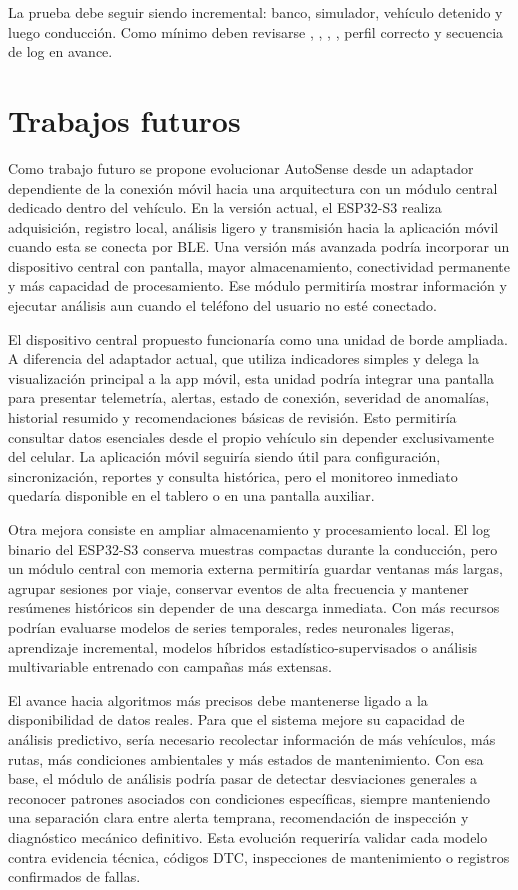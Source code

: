 \documentclass[12pt,letterpaper]{report}
\begin{document}
La prueba debe seguir siendo incremental: banco, simulador, vehículo detenido y luego conducción. Como mínimo deben revisarse , , , , perfil correcto y secuencia de log en avance.

\section{Trabajos futuros}

Como trabajo futuro se propone evolucionar AutoSense desde un adaptador dependiente de la conexión móvil hacia una arquitectura con un módulo central dedicado dentro del vehículo. En la versión actual, el ESP32-S3 realiza adquisición, registro local, análisis ligero y transmisión hacia la aplicación móvil cuando esta se conecta por BLE. Una versión más avanzada podría incorporar un dispositivo central con pantalla, mayor almacenamiento, conectividad permanente y más capacidad de procesamiento. Ese módulo permitiría mostrar información y ejecutar análisis aun cuando el teléfono del usuario no esté conectado.

El dispositivo central propuesto funcionaría como una unidad de borde ampliada. A diferencia del adaptador actual, que utiliza indicadores simples y delega la visualización principal a la app móvil, esta unidad podría integrar una pantalla para presentar telemetría, alertas, estado de conexión, severidad de anomalías, historial resumido y recomendaciones básicas de revisión. Esto permitiría consultar datos esenciales desde el propio vehículo sin depender exclusivamente del celular. La aplicación móvil seguiría siendo útil para configuración, sincronización, reportes y consulta histórica, pero el monitoreo inmediato quedaría disponible en el tablero o en una pantalla auxiliar.

Otra mejora consiste en ampliar almacenamiento y procesamiento local. El log binario del ESP32-S3 conserva muestras compactas durante la conducción, pero un módulo central con memoria externa permitiría guardar ventanas más largas, agrupar sesiones por viaje, conservar eventos de alta frecuencia y mantener resúmenes históricos sin depender de una descarga inmediata. Con más recursos podrían evaluarse modelos de series temporales, redes neuronales ligeras, aprendizaje incremental, modelos híbridos estadístico-supervisados o análisis multivariable entrenado con campañas más extensas.

El avance hacia algoritmos más precisos debe mantenerse ligado a la disponibilidad de datos reales. Para que el sistema mejore su capacidad de análisis predictivo, sería necesario recolectar información de más vehículos, más rutas, más condiciones ambientales y más estados de mantenimiento. Con esa base, el módulo de análisis podría pasar de detectar desviaciones generales a reconocer patrones asociados con condiciones específicas, siempre manteniendo una separación clara entre alerta temprana, recomendación de inspección y diagnóstico mecánico definitivo. Esta evolución requeriría validar cada modelo contra evidencia técnica, códigos DTC, inspecciones de mantenimiento o registros confirmados de fallas.
\end{document}
